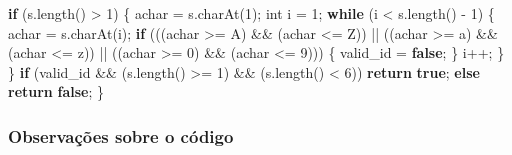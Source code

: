 \documentclass[
  letterpaper,
  DIV=11,
  numbers=noendperiod]{scrartcl}
\newenvironment{Shaded}{\begin{snugshade}}{\end{snugshade}}
\newcommand{\CharTok}[1]{\textcolor[rgb]{0.13,0.47,0.30}{#1}}
\newcommand{\ControlFlowTok}[1]{\textcolor[rgb]{0.00,0.23,0.31}{\textbf{#1}}}
\newcommand{\DataTypeTok}[1]{\textcolor[rgb]{0.68,0.00,0.00}{#1}}
\newcommand{\DecValTok}[1]{\textcolor[rgb]{0.68,0.00,0.00}{#1}}
\newcommand{\FunctionTok}[1]{\textcolor[rgb]{0.28,0.35,0.67}{#1}}
\newcommand{\KeywordTok}[1]{\textcolor[rgb]{0.00,0.23,0.31}{\textbf{#1}}}
\newcommand{\NormalTok}[1]{\textcolor[rgb]{0.00,0.23,0.31}{#1}}
\newcommand{\OperatorTok}[1]{\textcolor[rgb]{0.37,0.37,0.37}{#1}}
\begin{document}
\begin{Shaded}
\begin{Highlighting}[]
  \ControlFlowTok{if} \OperatorTok{(}\NormalTok{s}\OperatorTok{.}\FunctionTok{length}\OperatorTok{()} \OperatorTok{\textgreater{}} \DecValTok{1}\OperatorTok{)} \OperatorTok{\{}
\NormalTok{      achar }\OperatorTok{=}\NormalTok{ s}\OperatorTok{.}\FunctionTok{charAt}\OperatorTok{(}\DecValTok{1}\OperatorTok{);}
      \DataTypeTok{int}\NormalTok{ i }\OperatorTok{=} \DecValTok{1}\OperatorTok{;}
      \ControlFlowTok{while} \OperatorTok{(}\NormalTok{i }\OperatorTok{\textless{}}\NormalTok{ s}\OperatorTok{.}\FunctionTok{length}\OperatorTok{()} \OperatorTok{{-}} \DecValTok{1}\OperatorTok{)} \OperatorTok{\{}
\NormalTok{          achar }\OperatorTok{=}\NormalTok{ s}\OperatorTok{.}\FunctionTok{charAt}\OperatorTok{(}\NormalTok{i}\OperatorTok{);}
          \ControlFlowTok{if} \OperatorTok{(((}\NormalTok{achar }\OperatorTok{\textgreater{}=} \CharTok{\textquotesingle{}A\textquotesingle{}}\OperatorTok{)} \OperatorTok{\&\&} \OperatorTok{(}\NormalTok{achar }\OperatorTok{\textless{}=} \CharTok{\textquotesingle{}Z\textquotesingle{}}\OperatorTok{))} \OperatorTok{||} \OperatorTok{((}\NormalTok{achar }\OperatorTok{\textgreater{}=} \CharTok{\textquotesingle{}a\textquotesingle{}}\OperatorTok{)} \OperatorTok{\&\&} \OperatorTok{(}\NormalTok{achar }\OperatorTok{\textless{}=} \CharTok{\textquotesingle{}z\textquotesingle{}}\OperatorTok{))} \OperatorTok{||} \OperatorTok{((}\NormalTok{achar }\OperatorTok{\textgreater{}=} \CharTok{\textquotesingle{}0\textquotesingle{}}\OperatorTok{)} \OperatorTok{\&\&} \OperatorTok{(}\NormalTok{achar }\OperatorTok{\textless{}=} \CharTok{\textquotesingle{}9\textquotesingle{}}\OperatorTok{)))} \OperatorTok{\{}
\NormalTok{              valid\_id }\OperatorTok{=} \KeywordTok{false}\OperatorTok{;}
          \OperatorTok{\}}
\NormalTok{          i}\OperatorTok{++;}
      \OperatorTok{\}}
  \OperatorTok{\}}
  \ControlFlowTok{if} \OperatorTok{(}\NormalTok{valid\_id }\OperatorTok{\&\&} \OperatorTok{(}\NormalTok{s}\OperatorTok{.}\FunctionTok{length}\OperatorTok{()} \OperatorTok{\textgreater{}=} \DecValTok{1}\OperatorTok{)} \OperatorTok{\&\&} \OperatorTok{(}\NormalTok{s}\OperatorTok{.}\FunctionTok{length}\OperatorTok{()} \OperatorTok{\textless{}} \DecValTok{6}\OperatorTok{))}
      \ControlFlowTok{return} \KeywordTok{true}\OperatorTok{;}
  \ControlFlowTok{else}
      \ControlFlowTok{return} \KeywordTok{false}\OperatorTok{;}
\OperatorTok{\}}
\end{Highlighting}
\end{Shaded}

\subsubsection{\texorpdfstring{\textbf{Observações sobre o
código}}{Observações sobre o código}}\label{observauxe7uxf5es-sobre-o-cuxf3digo}
\end{document}

